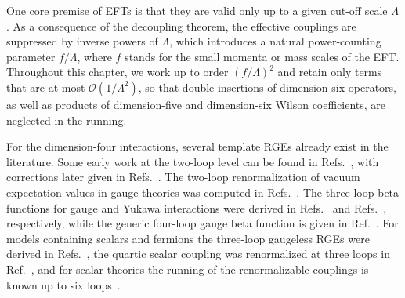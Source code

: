 One core premise of EFTs is that they are valid only up to a given cut-off scale $\Lambda$. As a
consequence of the decoupling theorem, the effective couplings are suppressed by inverse powers of
$\Lambda$, which introduces a natural power-counting parameter $f/\Lambda$, where $f$ stands for the
small momenta or mass scales of the EFT. Throughout this chapter, we work up to order $(f/\Lambda)^2$
and retain only terms that are at most $\mathcal{O}(1/\Lambda^2)$, so that double insertions of
dimension-six operators, as well as products of dimension-five and dimension-six Wilson coefficients,
are neglected in the running.

For the dimension-four interactions, several template RGEs already exist in the literature. Some early
work at the two-loop level can be found in
Refs.~\cite{Jack:1984vj,Machacek:1983tz,Machacek:1983fi,Machacek:1984zw}, with corrections later
given in Refs.~\cite{Luo:2002ti,Schienbein:2018fsw}. The two-loop renormalization of vacuum
expectation values in gauge theories was computed in Refs.~\cite{Sperling:2013eva,Sperling:2013xqa}.
The three-loop beta functions for gauge and Yukawa interactions were derived in
Refs.~\cite{Pickering:2001aq,Poole:2019kcm,Mihaila:2012pz} and
Refs.~\cite{Davies:2021mnc,Poole:2019txl}, respectively, while the generic four-loop gauge beta
function is given in Ref.~\cite{Bednyakov:2021qxa}. For models containing scalars and fermions the
three-loop gaugeless RGEs were derived in Refs.~\cite{Jack:2023zjt,Steudtner:2021fzs}, the quartic
scalar coupling was renormalized at three loops in Ref.~\cite{Steudtner:2024teg}, and for scalar
theories the running of the renormalizable couplings is known up to six
loops~\cite{Bednyakov:2021ojn,Bednyakov:2025sri}.

